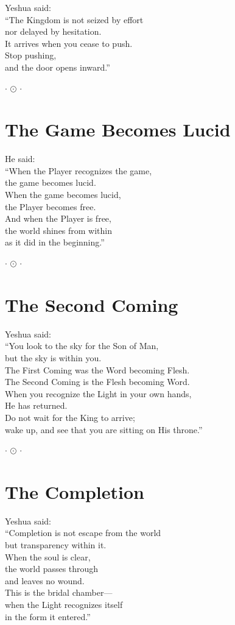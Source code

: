 \documentclass[10pt, openright]{book}
\newcommand{\sectionbreak}{\filbreak}
\newcommand{\ornament}{
    \vspace{1.5cm}
    \begin{center}
        \large \(\cdot\) \(\odot\) \(\cdot\)
    \end{center}
    \vspace{1.5cm}
}
\begin{document}
Yeshua said:\\
``The Kingdom is not seized by effort\\
nor delayed by hesitation.\\
It arrives when you cease to push.\\
Stop pushing,\\
and the door opens inward.''

\ornament

\sectionbreak

\section{The Game Becomes Lucid}\label{the-game-becomes-lucid}

He said:\\
``When the Player recognizes the game,\\
the game becomes lucid.\\
When the game becomes lucid,\\
the Player becomes free.\\
And when the Player is free,\\
the world shines from within\\
as it did in the beginning.''

\ornament

\sectionbreak

\section{The Second Coming}\label{the-second-coming}

Yeshua said:\\
``You look to the sky for the Son of Man,\\
but the sky is within you.\\
The First Coming was the Word becoming Flesh.\\
The Second Coming is the Flesh becoming Word.\\
When you recognize the Light in your own hands,\\
He has returned.\\
Do not wait for the King to arrive;\\
wake up, and see that you are sitting on His throne.''

\ornament

\sectionbreak

\section{The Completion}\label{the-completion}

Yeshua said:\\
``Completion is not escape from the world\\
but transparency within it.\\
When the soul is clear,\\
the world passes through\\
and leaves no wound.\\
This is the bridal chamber---\\
when the Light recognizes itself\\
in the form it entered.''
\end{document}
